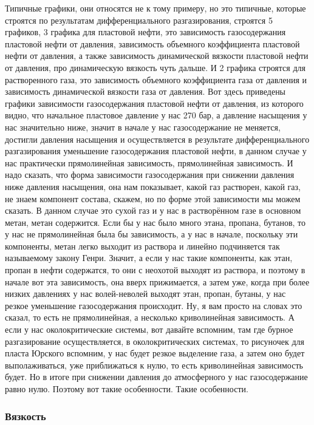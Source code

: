 \documentclass[main.tex]{subfiles}
\begin{document}
Типичные графики, они относятся не к тому примеру, но это типичные, которые строятся по результатам дифференциального разгазирования, строятся 5 графиков, 3 графика для пластовой нефти, это зависимость газосодержания пластовой нефти от давления, зависимость объемного коэффициента пластовой нефти от давления, а также зависимость динамической вязкости пластовой нефти от давления, про динамическую вязкость чуть дальше.
И 2 графика строятся для растворенного газа, это зависимость объемного коэффициента газа от давления и зависимость динамической вязкости газа от давления.
Вот здесь приведены графики зависимости газосодержания пластовой нефти от давления, из которого видно, что начальное пластовое давление у нас 270 бар, а давление насыщения у нас значительно ниже, значит в начале у нас газосодержание не меняется, достигли давления насыщения и осуществляется в результате дифференциального разгазирования уменьшение газосодержания пластовой нефти, в данном случае у нас практически прямолинейная зависимость, прямолинейная зависимость.
И надо сказать, что форма зависимости газосодержания при снижении давления ниже давления насыщения, она нам показывает, какой газ растворен, какой газ, не знаем компонент состава, скажем, но по форме этой зависимости мы можем сказать.
В данном случае это сухой газ и у нас в растворённом газе в основном метан, метан содержится.
Если бы у нас было много этана, пропана, бутанов, то у нас не прямолинейная была бы зависимость, а у нас в начале, поскольку эти компоненты, метан легко выходит из раствора и линейно подчиняется так называемому закону Генри.
Значит, а если у нас такие компоненты, как этан, пропан в нефти содержатся, то они с неохотой выходят из раствора, и поэтому в начале вот эта зависимость, она вверх прижимается, а затем уже, когда при более низких давлениях у нас волей-неволей выходят этан, пропан, бутаны, у нас резкое уменьшение газосодержания происходит.
Ну, я вам просто на словах это сказал, то есть не прямолинейная, а несколько криволинейная зависимость.
А если у нас околокритические системы, вот давайте вспомним, там где бурное разгазирование осуществляется, в околокритических системах, то рисуночек для пласта Юрского вспомним, у нас будет резкое выделение газа, а затем оно будет выполаживаться, уже приближаться к нулю, то есть криволинейная зависимость будет.
Но в итоге при снижении давления до атмосферного у нас газосодержание равно нулю.
Поэтому вот такие особенности.
Такие особенности.

\subsubsection{Вязкость}
\end{document}
